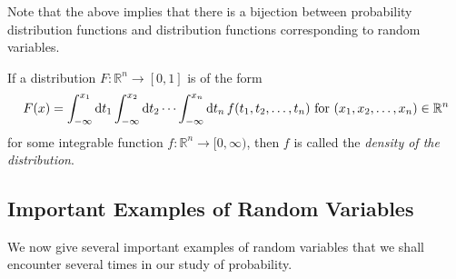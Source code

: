 Note that the above implies that there is a bijection between probability distribution functions and distribution functions corresponding to random variables.

\begin{definition}
    If a distribution $F:\mathbb{R}^n\to[0,1]$ is of the form
    $$F(x)=\int_{-\infty}^{x_1}\operatorname{d}\!{t_1}\int_{-\infty}^{x_2}\operatorname{d}\!{t_2}\cdots\int_{-\infty}^{x_n}\operatorname{d}\!{t_n}\, f(t_1,t_2,\ldots,t_n)\text{ for }(x_1,x_2,\ldots,x_n)\in\mathbb{R}^n$$
    for some integrable function $f:\mathbb{R}^n\to[0,\infty)$, then $f$ is called the \textit{density of the distribution}.
\end{definition}

\subsection{Important Examples of Random Variables}

We now give several important examples of random variables that we shall encounter several times in our study of probability.

